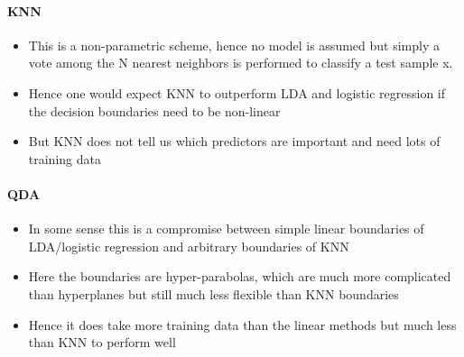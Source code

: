 \documentclass[../document.tex]{subfiles}
\begin{document}
	\paragraph{KNN}
	\begin{itemize}
		\item This is a non-parametric scheme, hence no model is assumed but simply a vote among the N nearest neighbors is performed to classify a test sample x.
		\item Hence one would expect KNN to outperform LDA and logistic regression if the decision boundaries need to be non-linear
		\item But KNN does not tell us which predictors are important and need lots of training data
	\end{itemize}

	\paragraph{QDA}
	\begin{itemize}
		\item In some sense this is a compromise between simple linear boundaries of LDA/logistic regression and arbitrary boundaries of KNN
		\item Here the boundaries are hyper-parabolas, which are much more complicated than hyperplanes but still much less flexible than KNN boundaries
		\item Hence it does take more training data than the linear methods but much less than KNN to perform well
	\end{itemize}
\end{document}
